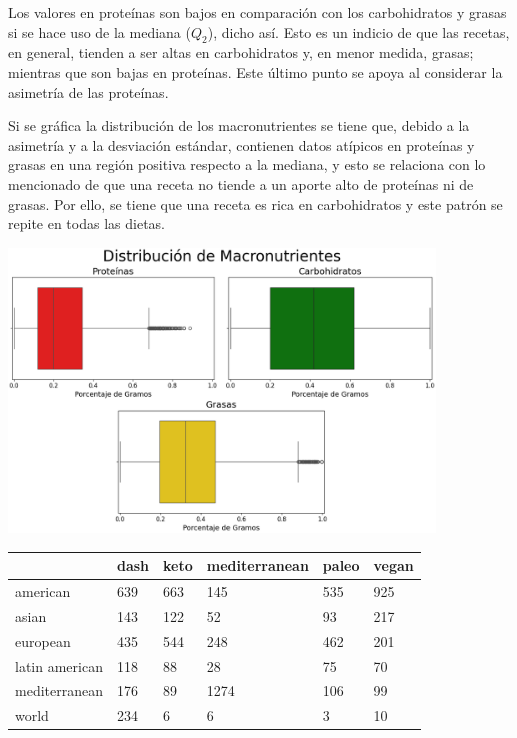 \documentclass[12pt,a4paper]{article}
\begin{document}
{{            Los valores en proteínas son bajos en comparación 
            con los carbohidratos y grasas si se hace uso de la mediana ($Q_2$), 
            dicho así. Esto es un indicio de que las recetas, en general, 
            tienden a ser altas en carbohidratos y, en menor medida, grasas; mientras que son bajas 
            en proteínas. Este último punto se apoya al considerar la asimetría de 
            las proteínas.\newline 

            Si se gráfica la distribución de los macronutrientes se tiene que, debido 
            a la asimetría y a la desviación estándar, contienen datos atípicos en proteínas 
            y grasas en una región positiva respecto a la mediana, y esto se relaciona con 
            lo mencionado de que una receta no tiende a un aporte alto de proteínas ni de grasas. 
            Por ello, se tiene que una receta es rica en carbohidratos y este patrón se 
            repite en todas las dietas.

            \begin{center}
                \includegraphics[width=0.85\textwidth]{Resources/EDA/VisionGeneral_1.png}

                \begin{xtabular}{w{l}{}|w{r}{} w{r}{} w{r}{} w{r}{} w{r}{}}
                \toprule
                    & dash & keto & mediterranean & paleo & vegan \\
                \midrule
                    american       & 639 & 663 & 145 & 535 & 925 \\
                    asian          & 143 & 122 & 52 & 93 & 217 \\
                    european       & 435 & 544 & 248 & 462 & 201 \\
                    latin american & 118 &  88 & 28 & 75 & 70 \\
                    mediterranean  & 176 &  89 & 1274 & 106 & 99 \\
                    world          & 234 &   6 & 6 & 3 & 10 \\
                \bottomrule
                \end{xtabular}
            \end{center}

}}
\end{document}
